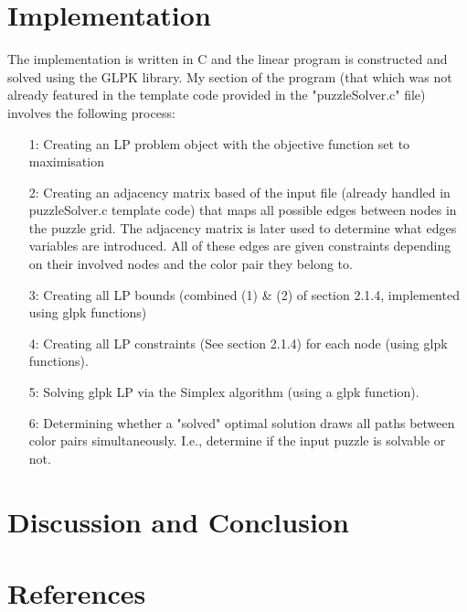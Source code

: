 \documentclass{homeworg}
\begin{document}
\section{Implementation}
The implementation is written in C and the linear program is constructed and solved using the GLPK library\cite{1}. My section of the program (that which was not already featured in the template code provided in the "puzzleSolver.c" file) involves the following process:\\
\begin{enumerate}
    \item[1:] Creating an LP problem object with the objective function set to maximisation
    \item[2:] Creating an adjacency matrix based of the input file (already handled in puzzleSolver.c template code) that maps all possible edges between nodes in the puzzle grid. The adjacency matrix is later used to determine what edges variables are introduced. All of these edges are given constraints depending on their involved nodes and the color pair they belong to.
    \item[3:] Creating all LP bounds (combined (1) \& (2) of section 2.1.4, implemented using glpk functions)
    \item[4:] Creating all LP constraints (See section 2.1.4) for each node (using glpk functions).
    \item[5:] Solving glpk LP via the Simplex algorithm (using a glpk function).
    \item[6:] Determining whether a "solved" optimal solution draws all paths between color pairs simultaneously. I.e., determine if the input puzzle is solvable or not.
\end{enumerate}


\section{Discussion and Conclusion}

\section{References}

\printbibliography
\end{document}
